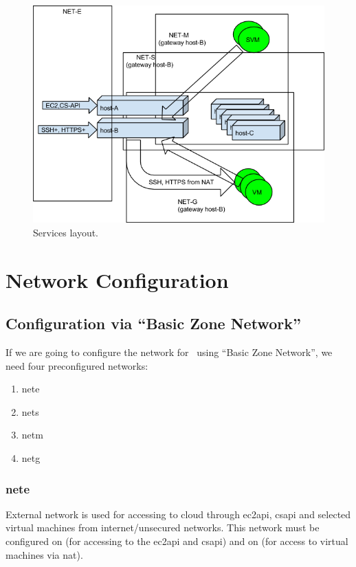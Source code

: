 \begin{figure}
	\begin{center}
		\includegraphics[width=\textwidth]{figures/layout}
	\end{center}
	\caption{Services layout.}
	\label{fig:hardware:layout}
\end{figure}

\section{Network Configuration}
\label{sct:hardware:network}

\subsection{Configuration via ``Basic Zone Network''}

If we are going to configure the network for \cstack\ using ``Basic Zone Network'', we need four preconfigured networks:
\begin{enumerate}
	\item \acrfull{nete}
	\item \acrfull{nets}
	\item \acrfull{netm}
	\item \acrfull{netg}
\end{enumerate}

\subsubsection{\acrfull{nete}}
External network is used for accessing to cloud through \acrshort{ec2api}, \acrshort{csapi} and selected virtual machines from internet/unsecured networks.
This network must be configured on  (for accessing to the \acrshort{ec2api} and \acrshort{csapi}) and on  (for access to virtual machines via \acrshort{nat}).

